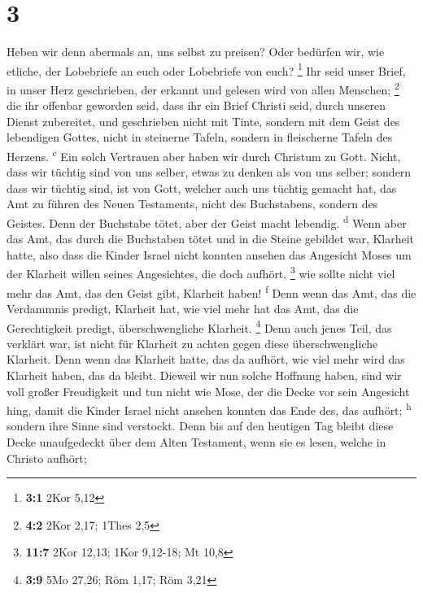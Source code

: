 \hypertarget{section-2}{%
\section{3}\label{section-2}}

 Heben wir denn abermals an, uns selbst zu preisen? Oder
bedürfen wir, wie etliche, der Lobebriefe an euch oder Lobebriefe von
euch? \footnote{\textbf{3:1} 2Kor 5,12}  Ihr seid unser
Brief, in unser Herz geschrieben, der erkannt und gelesen wird von allen
Menschen; \footnote{\textbf{4:2} 2Kor 2,17; 1Thes 2,5} 
die ihr offenbar geworden seid, dass ihr ein Brief Christi seid, durch
unseren Dienst zubereitet, und geschrieben nicht mit Tinte, sondern mit
dem Geist des lebendigen Gottes, nicht in steinerne Tafeln, sondern in
fleischerne Tafeln des Herzens. \textsuperscript{c}  Ein
solch Vertrauen aber haben wir durch Christum zu Gott. 
Nicht, dass wir tüchtig sind von uns selber, etwas zu denken als von uns
selber; sondern dass wir tüchtig sind, ist von Gott, 
welcher auch uns tüchtig gemacht hat, das Amt zu führen des Neuen
Testaments, nicht des Buchstabens, sondern des Geistes. Denn der
Buchstabe tötet, aber der Geist macht lebendig. \textsuperscript{d}
 Wenn aber das Amt, das durch die Buchstaben tötet und in
die Steine gebildet war, Klarheit hatte, also dass die Kinder Israel
nicht konnten ansehen das Angesicht Moses um der Klarheit willen seines
Angesichtes, die doch aufhört, \footnote{\textbf{11:7} 2Kor 12,13; 1Kor
  9,12-18; Mt 10,8}  wie sollte nicht viel mehr das Amt,
das den Geist gibt, Klarheit haben! \textsuperscript{f} 
Denn wenn das Amt, das die Verdammnis predigt, Klarheit hat, wie viel
mehr hat das Amt, das die Gerechtigkeit predigt, überschwengliche
Klarheit. \footnote{\textbf{3:9} 5Mo 27,26; Röm 1,17; Röm 3,21}
 Denn auch jenes Teil, das verklärt war, ist nicht für
Klarheit zu achten gegen diese überschwengliche Klarheit.
 Denn wenn das Klarheit hatte, das da aufhört, wie viel
mehr wird das Klarheit haben, das da bleibt.  Dieweil wir
nun solche Hoffnung haben, sind wir voll großer Freudigkeit
 und tun nicht wie Mose, der die Decke vor sein Angesicht
hing, damit die Kinder Israel nicht ansehen konnten das Ende des, das
aufhört; \textsuperscript{h}  sondern ihre Sinne sind
verstockt. Denn bis auf den heutigen Tag bleibt diese Decke unaufgedeckt
über dem Alten Testament, wenn sie es lesen, welche in Christo aufhört;
